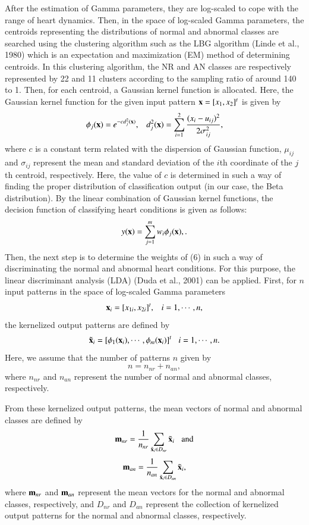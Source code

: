 \documentclass[times,twocolumn,final,authoryear]{elsarticle}
\begin{document}
After the estimation of Gamma parameters, they are log-scaled to cope with the range of heart dynamics. Then, in the space of log-scaled Gamma parameters, the centroids representing the distributions of normal and abnormal classes are searched using the clustering algorithm such as the LBG algorithm 
(Linde et al., 1980) which is an expectation and maximization (EM) method of determining centroids. In this clustering algorithm, the NR and AN classes are respectively represented by 22 and 11 clusters according to the sampling ratio of around 140 to 1. Then, for each centroid, a Gaussian kernel function is allocated. Here, the Gaussian kernel function for the given input pattern ${\bf x} = [x_1, x_2]^t$  is given by 
\begin{equation}
\phi_j({\bf x}) = e^{-cd_j^2({\bf x})}, \; \; \; d_j^2({\bf x}) = \sum_{i=1}^2{{(x_i - u_{ij})^2}\over{2\sigma_{ij}^2}}, \label{kernel}
\end{equation}
where $c$ is a constant term related with the dispersion of Gaussian function,
$\mu_{ij}$ and $\sigma_{ij}$ represent the mean and standard deviation of the $i$th coordinate of the $j$th centroid, respectively.
Here, the value of $c$ is determined in such a way of finding the proper distribution of classification output (in our case, the Beta distribution).
By the linear combination of Gaussian kernel functions, the decision function of classifying heart conditions is given as follows:
\begin{equation}
y({\bf x})=\sum_{j=1}^m w_i\phi_j({\bf x}), \label{y(x)}.
\label{decision}
\end{equation}
Then, the next step is to determine the weights of (6) in such a way of discriminating the normal and abnormal heart conditions. For this purpose, the linear discriminant analysis (LDA) (Duda et al., 2001) can be applied. First, for $n$ input patterns in the space of log-scaled Gamma parameters
 \[
{\bf x}_i = [x_{1i}, x_{2i}]^t, \; \; \; i= 1, \cdots, n,
\]
the kernelized output patterns are defined by
\[
\tilde{\bf x}_i = [\phi_1({\bf x}_i), \cdots, \phi_m({\bf x}_i)]^t \; \; \; i= 1, \cdots, n.
\]
Here, we assume that the number of patterns $n$ given by
\[
n = n_{nr} + n_{an},
\]
where $n_{nr}$ and $n_{an}$ represent the number of normal and abnormal classes, respectively.

From these kernelized output patterns, the mean vectors of normal and abnormal classes are defined by
\[
{\bf m}_{nr} = {1\over n_{nr}}\sum_{\tilde{\bf x}_i\in D_{nr}} \tilde{\bf x}_i \; \; \; \mbox{and}
\]
\[
{\bf m}_{an} = {1\over n_{an}}\sum_{\tilde{\bf x}_i\in D_{an}} \tilde{\bf x}_i, 
\]
where ${\bf m}_{nr}$ and ${\bf m}_{an}$ represent the mean vectors for the normal and abnormal classes, respectively, and 
$D_{nr}$ and $D_{an}$ represent the collection of kernelized output patterns for the normal and abnormal classes, respectively.
\end{document}
